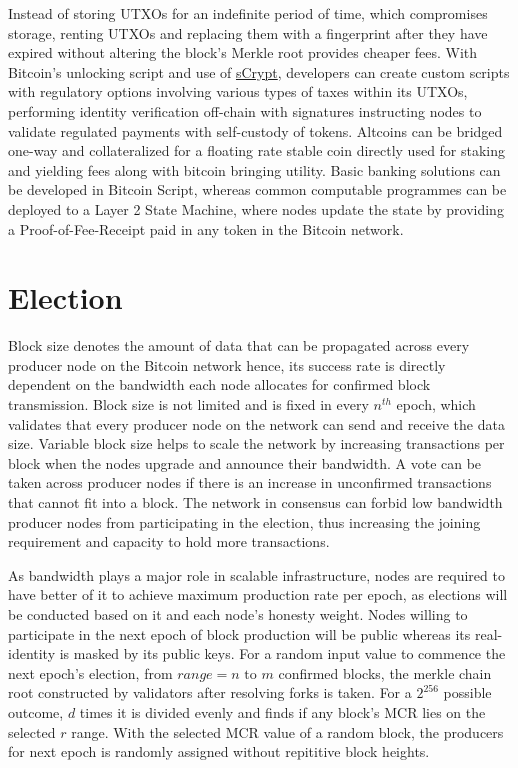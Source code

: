 \documentclass[a4paper,10pt]{article}
\begin{document}
Instead of storing UTXOs for an indefinite period of time, which compromises storage, renting UTXOs and replacing them with a fingerprint after they have expired without altering the block’s Merkle root provides cheaper fees. With Bitcoin’s unlocking script and use of \href{https://scrypt.io}{sCrypt}, developers can create custom scripts with regulatory options involving various types of taxes within its UTXOs, performing identity verification off-chain with signatures instructing nodes to validate regulated payments with self-custody of tokens. Altcoins can be bridged one-way and collateralized for a floating rate stable coin directly used for staking and yielding fees along with bitcoin bringing utility. Basic banking solutions can be developed in Bitcoin Script, whereas common computable programmes can be deployed to a Layer 2 State Machine, where nodes update the state by providing a Proof-of-Fee-Receipt paid in any token in the Bitcoin network. 
\section{Election}
Block size denotes the amount of data that can be propagated across every producer node on the Bitcoin network hence, its success rate is directly dependent on the bandwidth each node allocates for confirmed block transmission. Block size is not limited and is fixed in every $n^{th}$ epoch, which validates that every producer node on the network can send and receive the data size. Variable block size helps to scale the network by increasing transactions per block when the nodes upgrade and announce their bandwidth. A vote can be taken across producer nodes if there is an increase in unconfirmed transactions that cannot fit into a block. The network in consensus can forbid low bandwidth producer nodes from participating in the election, thus increasing the joining requirement and capacity to hold more transactions.

As bandwidth plays a major role in scalable infrastructure, nodes are required to have better of it to achieve maximum production rate per epoch, as elections will be conducted based on it and each node's honesty weight. Nodes willing to participate in the next epoch of block production will be public whereas its real-identity is masked by its public keys. For a random input value to commence the next epoch's election, from $range=n \text{ to } m$ confirmed blocks, the merkle chain root constructed by validators after resolving forks is taken. For a $2^{256}$ possible outcome, $d$ times it is divided evenly and finds if any block's MCR lies on the selected $r$ range. With the selected MCR value of a random block, the producers for next epoch is randomly assigned without repititive block heights. 
\end{document}
